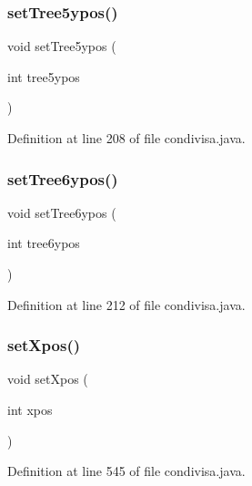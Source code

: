 \subsubsection{\texorpdfstring{set\+Tree5ypos()}{setTree5ypos()}}
{\footnotesize\ttfamily void set\+Tree5ypos (\begin{DoxyParamCaption}\item[{int}]{tree5ypos }\end{DoxyParamCaption})}



Definition at line 208 of file condivisa.\+java.

\mbox{\label{classcargame_1_1condivisa_ad0b9d3bbd4a7b0852f8fb84aaa101697}} 
\subsubsection{\texorpdfstring{set\+Tree6ypos()}{setTree6ypos()}}
{\footnotesize\ttfamily void set\+Tree6ypos (\begin{DoxyParamCaption}\item[{int}]{tree6ypos }\end{DoxyParamCaption})}



Definition at line 212 of file condivisa.\+java.

\mbox{\label{classcargame_1_1condivisa_a7dbd6bcc95ff7838423560d853e1ecec}} 
\subsubsection{\texorpdfstring{set\+Xpos()}{setXpos()}}
{\footnotesize\ttfamily void set\+Xpos (\begin{DoxyParamCaption}\item[{int}]{xpos }\end{DoxyParamCaption})}



Definition at line 545 of file condivisa.\+java.

